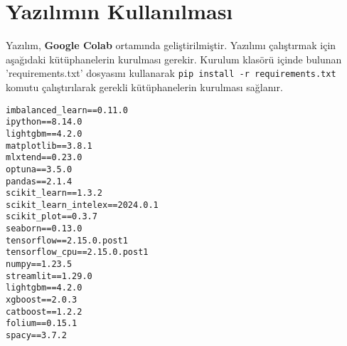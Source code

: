 \section{Yazılımın Kullanılması}
Yazılım, \textbf{Google Colab} ortamında geliştirilmiştir. Yazılımı çalıştırmak için aşağıdaki kütüphanelerin kurulması gerekir. Kurulum klasörü içinde bulunan 'requirements.txt' dosyasını kullanarak \texttt{pip install -r requirements.txt} komutu çalıştırılarak gerekli kütüphanelerin kurulması sağlanır. 
\begin{verbatim}
imbalanced_learn==0.11.0
ipython==8.14.0
lightgbm==4.2.0
matplotlib==3.8.1
mlxtend==0.23.0
optuna==3.5.0
pandas==2.1.4
scikit_learn==1.3.2
scikit_learn_intelex==2024.0.1
scikit_plot==0.3.7
seaborn==0.13.0
tensorflow==2.15.0.post1
tensorflow_cpu==2.15.0.post1
numpy==1.23.5
streamlit==1.29.0
lightgbm==4.2.0
xgboost==2.0.3
catboost==1.2.2
folium==0.15.1
spacy==3.7.2
\end{verbatim}